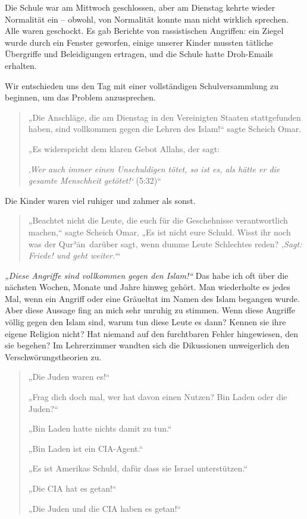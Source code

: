 \documentclass[12pt]{memoir}
\def\´{ʾ} %
\def \Quran{Qur\-\´ān} %
\def\–{\hskip0pt-\hskip0pt}
\begin{document}
Die Schule war am Mittwoch geschlossen,
aber am Dienstag kehrte wieder Normalität ein –
obwohl, von Normalität konnte man nicht wirklich sprechen.
Alle waren geschockt.
Es gab Berichte von rassistischen Angriffen:
ein Ziegel wurde durch ein Fenster geworfen,
einige unserer Kinder mussten tätliche Übergriffe und Beleidigungen ertragen,
und die Schule hatte Droh\–Emails erhalten.

Wir entschieden uns den Tag mit einer vollständigen Schulversammlung
zu beginnen, um das Problem anzusprechen.

\begin{quote}
„Die Anschläge, die am Dienstag in den Vereinigten Staaten stattgefunden haben,
sind vollkommen gegen die Lehren des Islam!“ sagte Scheich Omar.

„Es widerspricht dem klaren Gebot Allahs, der sagt:

\emph{‚Wer auch immer einen Unschuldigen tötet, so ist es,
als hätte er die gesamte Menschheit getötet!‘} (5:32)“
\end{quote}

Die Kinder waren viel ruhiger und zahmer als sonst.

\begin{quote}
„Beachtet nicht die Leute,
die euch für die Geschehnisse verantwortlich machen,“
sagte Scheich Omar,
„Es ist nicht eure Schuld.
Wisst ihr noch was der \Quran\ darüber sagt,
wenn dumme Leute Schlechtes reden?
\emph{‚Sagt: Friede! und geht weiter.‘}“
\end{quote}

\emph{„Diese Angriffe sind vollkommen gegen den Islam!“}
Das habe ich oft über die nächsten Wochen, Monate und Jahre hinweg gehört.
Man wiederholte es jedes Mal, wenn ein Angriff oder eine Gräueltat
im Namen des Islam begangen wurde.
Aber diese Aussage fing an mich sehr unruhig zu stimmen.
Wenn diese Angriffe völlig gegen den Islam sind,
warum tun diese Leute es dann?
Kennen sie ihre eigene Religion nicht?
Hat niemand auf den furchtbaren Fehler hingewiesen, den sie begehen?
Im Lehrerzimmer wandten sich die Dikussionen
unweigerlich den Verschwörungstheorien zu.

\begin{quote}
„Die Juden waren es!“

„Frag dich doch mal, wer hat davon einen Nutzen? Bin Laden oder die Juden?“

„Bin Laden hatte nichts damit zu tun.“

„Bin Laden ist ein CIA-Agent.“

„Es ist Amerikas Schuld, dafür dass sie Israel unterstützen.“

„Die CIA hat es getan!“

„Die Juden und die CIA haben es getan!“
\end{quote}
\end{document}
